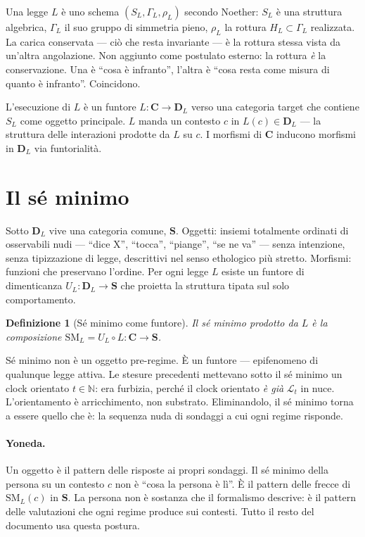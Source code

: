 \documentclass[
    oneside,                 %
    openany,                 %
    titlepage,
    11pt,
    a4paper,
    italian,
    DIV=14,                  %
    headinclude,
    footinclude=true,
    cleardoublepage=empty
]{scrbook}
\theoremstyle{ctplain}
\theoremstyle{ctdef}
\newtheorem{defn}[principio]{Definizione}
\theoremstyle{ctrem}
\newcommand{\Lt}{\mathcal{L}_t}
\begin{document}
Una legge $L$ è uno schema $(S_L, \Gamma_L, \rho_L)$ secondo Noether: $S_L$ è una struttura algebrica, $\Gamma_L$ il suo gruppo di simmetria pieno, $\rho_L$ la rottura $H_L \subset \Gamma_L$ realizzata. La carica conservata --- ciò che resta invariante --- è la rottura stessa vista da un'altra angolazione. Non aggiunto come postulato esterno: la rottura \emph{è} la conservazione. Una è ``cosa è infranto'', l'altra è ``cosa resta come misura di quanto è infranto''. Coincidono.

L'esecuzione di $L$ è un funtore $L : \mathbf{C} \to \mathbf{D}_L$ verso una categoria target che contiene $S_L$ come oggetto principale. $L$ manda un contesto $c$ in $L(c) \in \mathbf{D}_L$ --- la struttura delle interazioni prodotte da $L$ su $c$. I morfismi di $\mathbf{C}$ inducono morfismi in $\mathbf{D}_L$ via funtorialità.

\section*{Il sé minimo}

Sotto $\mathbf{D}_L$ vive una categoria comune, $\mathbf{S}$. Oggetti: insiemi totalmente ordinati di osservabili nudi --- ``dice X'', ``tocca'', ``piange'', ``se ne va'' --- senza intenzione, senza tipizzazione di legge, descrittivi nel senso ethologico più stretto. Morfismi: funzioni che preservano l'ordine. Per ogni legge $L$ esiste un funtore di dimenticanza $U_L : \mathbf{D}_L \to \mathbf{S}$ che proietta la struttura tipata sul solo comportamento.

\begin{defn}[Sé minimo come funtore]
Il sé minimo prodotto da $L$ è la composizione $\mathrm{SM}_L = U_L \circ L : \mathbf{C} \to \mathbf{S}$.
\end{defn}

Sé minimo non è un oggetto pre-regime. È un funtore --- epifenomeno di qualunque legge attiva. Le stesure precedenti mettevano sotto il sé minimo un clock orientato $t \in \mathbb{N}$: era furbizia, perché il clock orientato \emph{è già} $\Lt$ in nuce. L'orientamento è arricchimento, non substrato. Eliminandolo, il sé minimo torna a essere quello che è: la sequenza nuda di sondaggi a cui ogni regime risponde.

\paragraph{Yoneda.} Un oggetto è il pattern delle risposte ai propri sondaggi. Il sé minimo della persona su un contesto $c$ non è ``cosa la persona è lì''. È il pattern delle frecce di $\mathrm{SM}_L(c)$ in $\mathbf{S}$. La persona non è sostanza che il formalismo descrive: è il pattern delle valutazioni che ogni regime produce sui contesti. Tutto il resto del documento usa questa postura.
\end{document}
